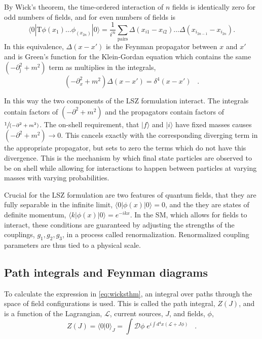  By Wick's theorem, the time-ordered interaction of $n$ fields
  is identically zero for odd numbers of fields, and for even numbers
  of fields is 
\begin{equation}\label{eq:wicksthm}
 \langle 0 | \mathrm{T} \phi(x_1)\dots \phi_(x_{2n}) | 0 \rangle
  = \frac{1}{i^n}\sum_{\mathrm{pairs}}\Delta(x_{i1}-x_{i2})\dots\Delta(x_{i_{2n-1}}-x_{i_{2n}}).
\end{equation}
 In this equivalence, $\Delta(x-x')$ is the 
  Feynman propagator between $x$ and $x'$
  and is Green's function for
  the Klein-Gordan equation
  which contains the same $(-\partial^2_\mathrm{j} + m^2)$ 
  term as multiplies in the integrals,
\begin{equation}\label{eq:feynprop}
 \left(-\partial_x^2 + m^2\right)\Delta(x-x') = \delta^4(x-x')\;\;\;.
\end{equation}

 In this way the two components of the LSZ
  formulation interact. 
 The integrals contain factors of $(-\partial^2+m^2)$
  and the propagators contain factors
  of $\sfrac{1}{(-\partial^2+m^2)}$.
 The on-shell requirement, that
  $| f \rangle$ and $| i \rangle$ 
  have fixed masses causes $(-\partial^2+m^2)\rightarrow 0$.
 This cancels exactly with the 
  corresponding diverging term in the
  appropriate  propagator, 
  but  sets to zero the terms which do not have 
  this divergence.
 This is the mechanism by which final
  state particles are observed to be
  on shell
  while allowing for interactions
  to happen between particles at
  varying masses with varying probabilities.

 Crucial for the LSZ formulation are
  two features of quantum fields,
  that they are fully separable in the 
  infinite limit,
  $\langle 0 | \phi(x) | 0 \rangle = 0$,
  and the they are states of definite momentum,
  $ \langle k | \phi(x) | 0 \rangle = e^{-ikx}$.
 In the SM, which
  allows for fields to interact, these
  conditions are guaranteed by adjusting the
  strengths of the couplings, $g_1,g_2,g_3$,
  in a process called renormalization.
 Renormalized coupling parameters are
  thus tied to a physical scale.
  
\subsection{Path integrals and Feynman diagrams}\label{sec:PIandFD}

 To calculate the expression in \ref{eq:wicksthm},
  an integral over paths through the 
  space of field configurations is used.
 This is called the path integral, $Z(J)$,
  and  is a function of 
  the Lagrangian, $\mathcal{L}$, 
  current sources, $J$, and fields, $\phi$,
\begin{equation}\label{eq:pathintegral}
Z(J) = \langle 0 | 0 \rangle_J = \int \mathcal{D}\phi
       \;e^{ i \int d^4x \left(\mathcal{L}+J\phi \right)}\;\;\;.
\end{equation}

